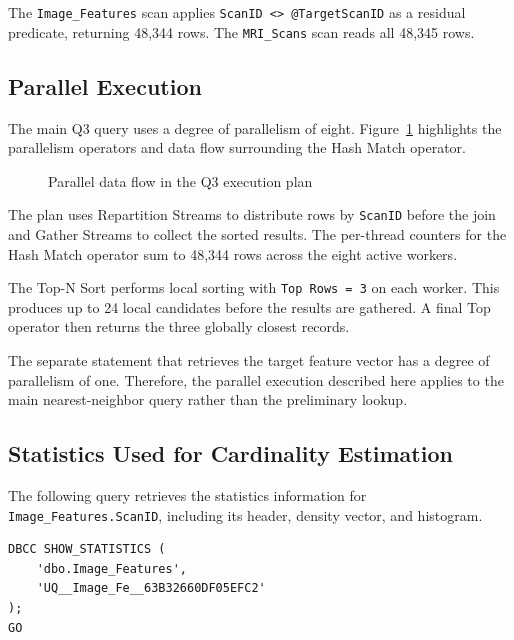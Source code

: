 The \texttt{Image\_Features} scan applies \texttt{ScanID <> @TargetScanID} as a residual predicate, returning 48,344 rows. The \texttt{MRI\_Scans} scan reads all 48,345 rows.

\subsection{Parallel Execution}

The main Q3 query uses a degree of parallelism of eight. Figure~\ref{fig:q3-parallel} highlights the parallelism operators and data flow surrounding the Hash Match operator.

\newpage

\begin{figure}[htbp]
\centering
{}
\caption{Parallel data flow in the Q3 execution plan}
\label{fig:q3-parallel}
\end{figure}

The plan uses Repartition Streams to distribute rows by \texttt{ScanID} before the join and Gather Streams to collect the sorted results. The per-thread counters for the Hash Match operator sum to 48,344 rows across the eight active workers.

The Top-N Sort performs local sorting with \texttt{Top Rows = 3} on each worker. This produces up to 24 local candidates before the results are gathered. A final Top operator then returns the three globally closest records.

The separate statement that retrieves the target feature vector has a degree of parallelism of one. Therefore, the parallel execution described here applies to the main nearest-neighbor query rather than the preliminary lookup.

\subsection{Statistics Used for Cardinality Estimation}

The following query retrieves the statistics information for \texttt{Image\_Features.ScanID}, including its header, density vector, and histogram.

\begin{lstlisting}[caption={Retrieving Q3 statistics for Image\_Features.ScanID},
                   label={lst:q3-statistics}]
DBCC SHOW_STATISTICS (
    'dbo.Image_Features',
    'UQ__Image_Fe__63B32660DF05EFC2'
);
GO
\end{lstlisting}

